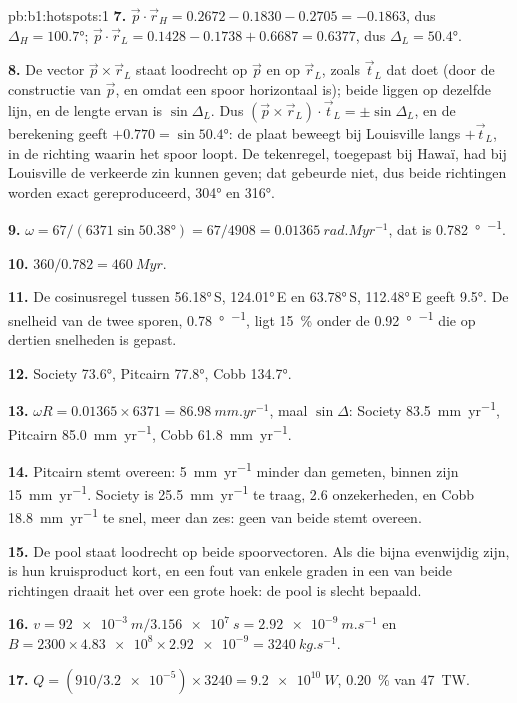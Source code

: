 \begin{solution}{pb:b1:hotspots:1}
\textbf{7.} $\vec p\cdot\vec r_H = 0.2672 - 0.1830 - 0.2705 = -0.1863$, dus
$\Delta_H = \ang{100.7}$; $\vec p\cdot\vec r_L = 0.1428 - 0.1738 + 0.6687 =
0.6377$, dus $\Delta_L = \ang{50.4}$.

\textbf{8.} De vector $\vec p\times\vec r_L$ staat loodrecht op $\vec p$ en op $\vec r_L$, zoals $\vec t_L$ dat doet (door de constructie van $\vec p$, en omdat een spoor horizontaal is); beide liggen op dezelfde lijn, en de lengte ervan is $\sin\Delta_L$. Dus $(\vec p\times\vec r_L)\cdot\vec t_L = \pm\sin\Delta_L$, en de berekening geeft $+0.770 = \sin\ang{50.4}$: de plaat beweegt bij Louisville langs $+\vec t_L$, in de richting waarin het spoor loopt. De tekenregel, toegepast bij Hawaï, had bij Louisville de verkeerde zin kunnen geven; dat gebeurde niet, dus beide richtingen worden exact gereproduceerd, \ang{304} en \ang{316}.

\textbf{9.} $\omega = 67/(6371\sin\ang{50.38}) = 67/4908 =
\qty{0.01365}{rad.Myr^{-1}}$, dat is \qty{0.782}{\degree\per\Myr}.

\textbf{10.} $360/0.782 = \qty{460}{Myr}$.

\textbf{11.} De cosinusregel tussen \ang{56.18}\,S, \ang{124.01}\,E en
\ang{63.78}\,S, \ang{112.48}\,E geeft \ang{9.5}. De snelheid van de twee sporen,
\qty{0.78}{\degree\per\Myr}, ligt \qty{15}{\percent} onder de
\qty{0.92}{\degree\per\Myr} die op dertien snelheden is gepast.

\textbf{12.} Society \ang{73.6}, Pitcairn \ang{77.8}, Cobb \ang{134.7}.

\textbf{13.} $\omega R = 0.01365\times6371 = \qty{86.98}{mm.yr^{-1}}$, maal
$\sin\Delta$: Society \qty{83.5}{mm.yr^{-1}}, Pitcairn
\qty{85.0}{mm.yr^{-1}}, Cobb \qty{61.8}{mm.yr^{-1}}.

\textbf{14.} Pitcairn stemt overeen: \qty{5}{mm.yr^{-1}} minder dan gemeten, binnen
zijn \qty{15}{mm.yr^{-1}}. Society is \qty{25.5}{mm.yr^{-1}} te traag, 2.6
onzekerheden, en Cobb \qty{18.8}{mm.yr^{-1}} te snel, meer dan zes: geen van beide
stemt overeen.

\textbf{15.} De pool staat loodrecht op beide spoorvectoren. Als die bijna evenwijdig zijn, is hun kruisproduct kort, en een fout van enkele graden in een van beide richtingen draait het over een grote hoek: de pool is slecht bepaald.

\textbf{16.} $v = \qty{92e-3}{m}/\qty{3.156e7}{s} = \qty{2.92e-9}{m.s^{-1}}$
en $B = 2300\times\num{4.83e8}\times\num{2.92e-9} = \qty{3240}{kg.s^{-1}}$.

\textbf{17.} $Q = (910/\num{3.2e-5})\times3240 = \qty{9.2e10}{W}$,
\qty{0.20}{\percent} van \qty{47}{TW}.


\end{solution}
